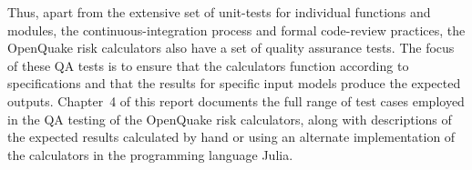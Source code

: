 Thus, apart from the extensive set of unit-tests for individual functions and modules, the continuous-integration process and formal code-review practices, the OpenQuake risk calculators also have a set of quality assurance tests. The focus of these QA tests is to ensure that the calculators function according to specifications and that the results for specific input models produce the expected outputs. Chapter~4 of this report documents the full range of test cases employed in the QA testing of the OpenQuake risk calculators, along with descriptions of the expected results calculated by hand or using an alternate implementation of the calculators in the programming language Julia.

